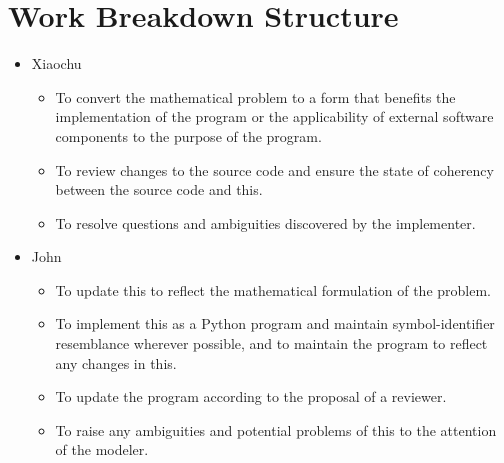 \section{Work Breakdown Structure}
\begin{itemize}


\item Xiaochu
  \begin{itemize}
  \item To convert the mathematical problem to a form that benefits the
    implementation of the program or the applicability of external software
    components to the purpose of the program.
  \item To review changes to the source code and ensure the state of coherency
    between the source code and \gls{this}.
  \item To resolve questions and ambiguities discovered by the implementer.
  \end{itemize}



\item John
  \begin{itemize}
  \item To update \gls{this} to reflect the mathematical formulation of the
    problem.
  \item To implement \gls{this} as a Python program and maintain
    symbol-identifier resemblance wherever possible, and to maintain the program
    to reflect any changes in \gls{this}.
  \item To update the program according to the proposal of a reviewer.
  \item To raise any ambiguities and potential problems of \gls{this} to the
    attention of the modeler.
  \end{itemize}






\end{itemize}
